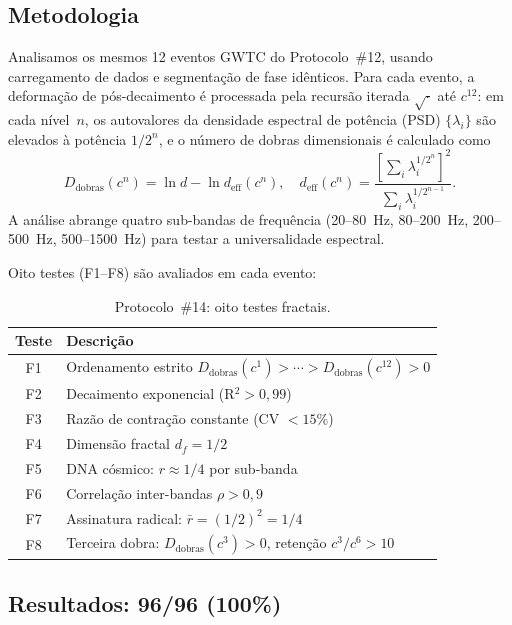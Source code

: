 \documentclass[12pt,a4paper,twocolumn]{article}
\newcommand{\Dfolds}{D_{\text{dobras}}}
\begin{document}
\subsection{Metodologia}

Analisamos os mesmos 12 eventos GWTC do Protocolo~\#12, usando carregamento de dados e segmentação de fase idênticos. Para cada evento, a deformação de pós-decaimento é processada pela recursão iterada $\sqrt{\cdot}$ até $c^{12}$: em cada nível~$n$, os autovalores da densidade espectral de potência (PSD) $\{\lambda_i\}$ são elevados à potência $1/2^n$, e o número de dobras dimensionais é calculado como
\begin{equation}
\Dfolds(c^n) = \ln d - \ln d_{\text{eff}}(c^n), \quad d_{\text{eff}}(c^n) = \frac{\left[\sum_i \lambda_i^{1/2^n}\right]^2}{\sum_i \lambda_i^{1/2^{n-1}}}.
\end{equation}
A análise abrange quatro sub-bandas de frequência (20--80~Hz, 80--200~Hz, 200--500~Hz, 500--1500~Hz) para testar a universalidade espectral.

Oito testes (F1--F8) são avaliados em cada evento:

\begin{table}[H]
\centering
\caption{Protocolo~\#14: oito testes fractais.}
\label{tab:f14tests}
\small
\begin{tabular}{@{}cl@{}}
\toprule
Teste & Descrição \\
\midrule
F1 & Ordenamento estrito $\Dfolds(c^1) > \cdots > \Dfolds(c^{12}) > 0$ \\
F2 & Decaimento exponencial (R$^2 > 0{,}99$) \\
F3 & Razão de contração constante (CV $< 15\%$) \\
F4 & Dimensão fractal $d_f = 1/2$ \\
F5 & DNA cósmico: $r \approx 1/4$ por sub-banda \\
F6 & Correlação inter-bandas $\rho > 0{,}9$ \\
F7 & Assinatura radical: $\bar{r} = (1/2)^2 = 1/4$ \\
F8 & Terceira dobra: $\Dfolds(c^3) > 0$, retenção $c^3/c^6 > 10$ \\
\bottomrule
\end{tabular}
\end{table}

\subsection{Resultados: 96/96 (100\%)}
\end{document}
